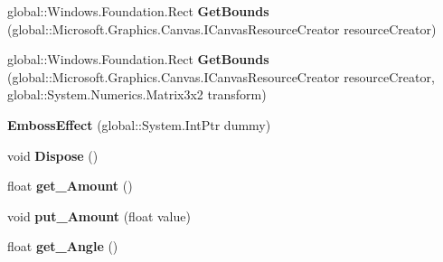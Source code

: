 \begin{DoxyCompactItemize}
\mbox{\label{class_microsoft_1_1_graphics_1_1_canvas_1_1_effects_1_1_emboss_effect_a447c5d2e98d82eee9645d76bf8645f44}} 
global\+::\+Windows.\+Foundation.\+Rect {\bfseries Get\+Bounds} (global\+::\+Microsoft.\+Graphics.\+Canvas.\+I\+Canvas\+Resource\+Creator resource\+Creator)
\item 
\mbox{\label{class_microsoft_1_1_graphics_1_1_canvas_1_1_effects_1_1_emboss_effect_a332e3f4203f0f5fc176b241c611be3b3}} 
global\+::\+Windows.\+Foundation.\+Rect {\bfseries Get\+Bounds} (global\+::\+Microsoft.\+Graphics.\+Canvas.\+I\+Canvas\+Resource\+Creator resource\+Creator, global\+::\+System.\+Numerics.\+Matrix3x2 transform)
\item 
\mbox{\label{class_microsoft_1_1_graphics_1_1_canvas_1_1_effects_1_1_emboss_effect_a2d3861da33bd9475d1e949275788def0}} 
{\bfseries Emboss\+Effect} (global\+::\+System.\+Int\+Ptr dummy)
\item 
\mbox{\label{class_microsoft_1_1_graphics_1_1_canvas_1_1_effects_1_1_emboss_effect_aa39c97e030897236bc8071c5e9c5de62}} 
void {\bfseries Dispose} ()
\item 
\mbox{\label{class_microsoft_1_1_graphics_1_1_canvas_1_1_effects_1_1_emboss_effect_ad824b28bb284838b16307bbffbeb0668}} 
float {\bfseries get\+\_\+\+Amount} ()
\item 
\mbox{\label{class_microsoft_1_1_graphics_1_1_canvas_1_1_effects_1_1_emboss_effect_a49add22dd56a5fa85ae8c613d6b7561c}} 
void {\bfseries put\+\_\+\+Amount} (float value)
\item 
\mbox{\label{class_microsoft_1_1_graphics_1_1_canvas_1_1_effects_1_1_emboss_effect_a26a7de6dacb9be149789779457828ed3}} 
float {\bfseries get\+\_\+\+Angle} ()
\item 
\mbox{\label{class_microsoft_1_1_graphics_1_1_canvas_1_1_effects_1_1_emboss_effect_ad7260653a41639ec65d5c966c05ba7a2}} 

\end{DoxyCompactItemize}

